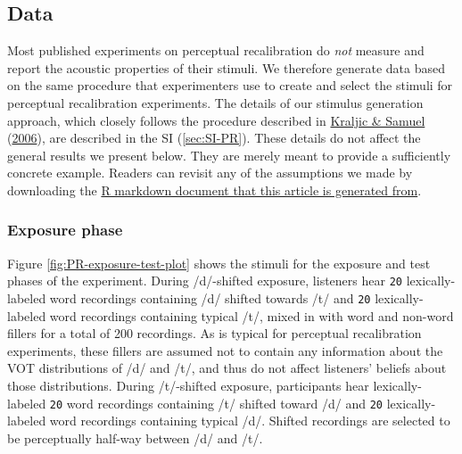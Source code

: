 \documentclass[
  11pt,
  english,
  man,floatsintext]{apa6}
\begin{document}
\hypertarget{data}{%
\subsection{Data}\label{data}}

Most published experiments on perceptual recalibration do \emph{not} measure and report the acoustic properties of their stimuli. We therefore generate data based on the same procedure that experimenters use to create and select the stimuli for perceptual recalibration experiments. The details of our stimulus generation approach, which closely follows the procedure described in \protect\hyperlink{ref-kraljic-samuel2006}{Kraljic \& Samuel} (\protect\hyperlink{ref-kraljic-samuel2006}{2006}), are described in the SI (\ref{sec:SI-PR}). These details do not affect the general results we present below. They are merely meant to provide a sufficiently concrete example. Readers can revisit any of the assumptions we made by downloading the \href{https://osf.io/q7gjp/}{R markdown document that this article is generated from}.

\hypertarget{exposure-phase}{%
\subsubsection{Exposure phase}\label{exposure-phase}}

Figure \ref{fig:PR-exposure-test-plot} shows the stimuli for the exposure and test phases of the experiment. During /d/-shifted exposure, listeners hear \texttt{20} lexically-labeled word recordings containing /d/ shifted towards /t/ and \texttt{20} lexically-labeled word recordings containing typical /t/, mixed in with word and non-word fillers for a total of 200 recordings. As is typical for perceptual recalibration experiments, these fillers are assumed not to contain any information about the VOT distributions of /d/ and /t/, and thus do not affect listeners' beliefs about those distributions. During /t/-shifted exposure, participants hear lexically-labeled \texttt{20} word recordings containing /t/ shifted toward /d/ and \texttt{20} lexically-labeled word recordings containing typical /d/. Shifted recordings are selected to be perceptually half-way between /d/ and /t/.
\end{document}
